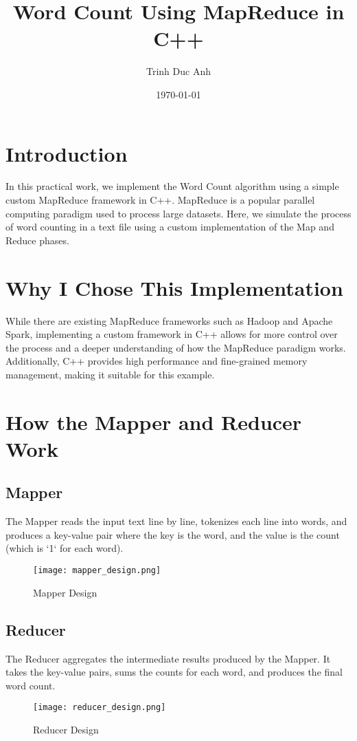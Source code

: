 \documentclass{article}
\title{Word Count Using MapReduce in C++}
\author{Trinh Duc Anh}
\date{\today}
\begin{document}
\maketitle

\section{Introduction}
In this practical work, we implement the Word Count algorithm using a simple custom MapReduce framework in C++. MapReduce is a popular parallel computing paradigm used to process large datasets. Here, we simulate the process of word counting in a text file using a custom implementation of the Map and Reduce phases.

\section{Why I Chose This Implementation}
While there are existing MapReduce frameworks such as Hadoop and Apache Spark, implementing a custom framework in C++ allows for more control over the process and a deeper understanding of how the MapReduce paradigm works. Additionally, C++ provides high performance and fine-grained memory management, making it suitable for this example.

\section{How the Mapper and Reducer Work}
\subsection{Mapper}
The Mapper reads the input text line by line, tokenizes each line into words, and produces a key-value pair where the key is the word, and the value is the count (which is `1` for each word).

\begin{figure}[h!]
\centering
\texttt{[image: mapper\_design.png]}
\caption{Mapper Design}
\end{figure}

\subsection{Reducer}
The Reducer aggregates the intermediate results produced by the Mapper. It takes the key-value pairs, sums the counts for each word, and produces the final word count.

\begin{figure}[h!]
\centering
\texttt{[image: reducer\_design.png]}
\caption{Reducer Design}
\end{figure}
\end{document}

